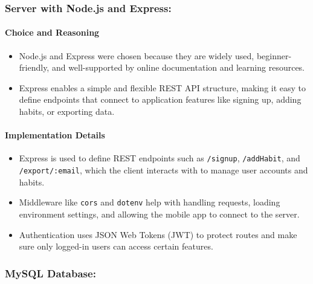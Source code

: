 \subsubsection{Server with Node.js and Express:}

\paragraph{Choice and Reasoning}
\begin{itemize}
\item Node.js and Express were chosen because they are widely used, beginner-friendly, and well-supported by online documentation and learning resources.
\item Express enables a simple and flexible REST API structure, making it easy to define endpoints that connect to application features like signing up, adding habits, or exporting data.
\end{itemize}

\paragraph{Implementation Details}
\begin{itemize}
\item Express is used to define REST endpoints such as \texttt{/signup}, \texttt{/addHabit}, and \texttt{/export/:email}, which the client interacts with to manage user accounts and habits.
\item Middleware like \texttt{cors} and \texttt{dotenv} help with handling requests, loading environment settings, and allowing the mobile app to connect to the server.
\item Authentication uses JSON Web Tokens (JWT) to protect routes and make sure only logged-in users can access certain features.
\end{itemize}

\subsubsection{MySQL Database:}

